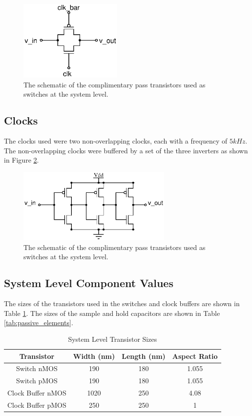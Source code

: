 \documentclass[journal]{IEEEtran}
\begin{document}
\begin{figure}
\centering
\includegraphics[width=2in]{Schematics/switch.eps}
\caption{The schematic of the complimentary pass transistors used as switches at the system level.}
\label{fig:switch_schem}
\end{figure}

\subsection{Clocks}
The clocks used were two non-overlapping clocks, each with a frequency of $5kHz$. The non-overlapping clocks were buffered by a set of the three inverters as shown in Figure \ref{fig:clock_buffer}.

\begin{figure}
\centering
\includegraphics[width=3in]{Schematics/clk_buffer_n.eps}
\caption{The schematic of the complimentary pass transistors used as switches at the system level.}
\label{fig:clock_buffer}
\end{figure}

\subsection{System Level Component Values}
The sizes of the transistors used in the switches and clock buffers are shown in Table \ref{tab:sys_trans_sizes}. The sizes of the sample and hold capacitors are shown in Table \ref{tab:passive_elements}.

\begin{table}
\centering
\caption{System Level Transistor Sizes}
\label{tab:sys_trans_sizes}
\begin{tabular}{|c|c|c|c|}
\hline Transistor & Width (nm) & Length (nm) & Aspect Ratio \\ 
\hline Switch nMOS & 190 & 180 & 1.055 \\ 
\hline Switch pMOS & 190 & 180 & 1.055 \\ 
\hline Clock Buffer nMOS & 1020 & 250 & 4.08 \\
\hline Clock Buffer pMOS & 250 & 250 & 1 \\  
\hline 
\end{tabular} 
\end{table}
\end{document}
